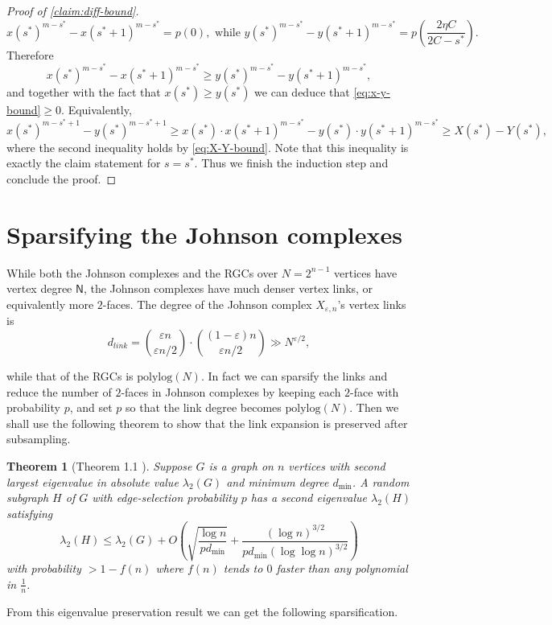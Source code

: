 \documentclass[10pt,a4paper]{article}
\newcommand{\prettyref}[1]{\cref{#1}}
\newtheorem{theorem}{Theorem}[section]
\theoremstyle{definition}
\theoremstyle{remark}
\renewcommand{\le}{\leqslant}
\renewcommand{\ge}{\geqslant}
\numberwithin{equation}{section}
\let\pref=\prettyref
\begin{document}
\begin{proof}[Proof of \pref{claim:diff-bound}]
     \[x(s^*)^{m-s^*} - x(s^*+1)^{m-s^*} = p(0),\text{ while }y(s^*)^{m-s^*} - y(s^*+1)^{m-s^*} = p\left(\frac{2\eta C}{2C - s^*}\right).\]
     Therefore
     \[x(s^*)^{m-s^*} - x(s^*+1)^{m-s^*} \ge y(s^*)^{m-s^*} - y(s^*+1)^{m-s^*},\]
     and together with the fact  that $x(s^*) \ge y(s^*)$ we can deduce that \eqref{eq:x-y-bound}$\ge 0$. Equivalently,
     \[ x(s^*)^{m-s^*+1} - y(s^*)^{m-s^*+1} \ge x(s^*) \cdot x(s^*+1)^{m-s^*} -  y(s^*) \cdot y(s^*+1)^{m-s^*} \ge X(s^*) - Y(s^*),  \]
     where the second inequality holds by \eqref{eq:X-Y-bound}. Note that this inequality is exactly the claim  statement for $s = s^*$. Thus we finish the induction step and conclude the proof.
\end{proof}

\section{Sparsifying the Johnson complexes}
\label{app:sparsify-JC}

While both the Johnson complexes and the RGCs over $N = 2^{n-1}$ vertices have vertex degree $\mathsf{N}$, the Johnson complexes have much denser vertex links, or equivalently more $2$-faces. The degree of the Johnson complex $X_{\varepsilon,n}$'s vertex links is 
\[d_{link} = {\binom{\varepsilon n}{\varepsilon n/2}}\cdot {\binom{(1-\varepsilon) n}{\varepsilon n/2}} \gg N^{\varepsilon/2} 
,\]

while that of the RGCs is $\mathrm{polylog}(N)$. In fact we can sparsify the links and reduce the number of $2$-faces in Johnson complexes by keeping each $2$-face with probability $p$, and set $p$ so that the link degree becomes $\mathrm{polylog}(N)$. Then we shall use the following theorem to show that the link expansion is preserved after subsampling.  

\begin{theorem}[Theorem 1.1 \cite{ChungH07}]
    Suppose $G$ is a graph on $n$ vertices with second largest eigenvalue in absolute value $\lambda_2(G)$ and minimum degree $d_{\min}$. A random subgraph $H$ of $G$ with edge-selection probability $p$ has a second eigenvalue $\lambda_2(H)$ satisfying
 \[ \lambda_2(H) \le \lambda_2(G) + O\left( \sqrt{\frac{\log n}{pd_{\min}}} + \frac{(\log n)^{3/2}}{pd_{\min} (\log\log n)^{3/2}}\right)\]
 with probability $>1 - f(n)$ where \(f(n)\) tends to \(0\) faster than any polynomial in $\frac{1}{n}$.
\end{theorem}
From this eigenvalue preservation result we can get the following sparsification.
\end{document}

